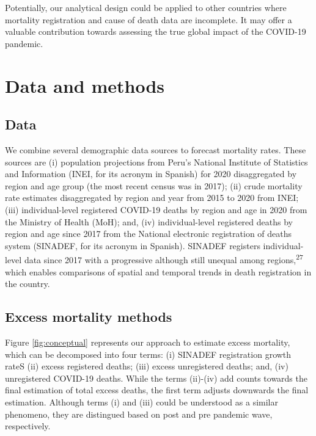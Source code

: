 \documentclass[
]{article}
\begin{document}
Potentially, our analytical design could be applied to other countries where mortality registration and cause of death data are incomplete. It may offer a valuable contribution towards assessing the true global impact of the COVID-19 pandemic.

\hypertarget{data-and-methods}{%
\section{Data and methods}\label{data-and-methods}}

\hypertarget{data}{%
\subsection{Data}\label{data}}

We combine several demographic data sources to forecast mortality rates. These sources are (i) population projections from Peru's National Institute of Statistics and Information (INEI, for its acronym in Spanish) for 2020 disaggregated by region and age group (the most recent census was in 2017); (ii) crude mortality rate estimates disaggregated by region and year from 2015 to 2020 from INEI; (iii) individual-level registered COVID-19 deaths by region and age in 2020 from the Ministry of Health (MoH); and, (iv) individual-level registered deaths by region and age since 2017 from the National electronic registration of deaths system (SINADEF, for its acronym in Spanish). SINADEF registers individual-level data since 2017 with a progressive although still unequal among regions,\textsuperscript{27} which enables comparisons of spatial and temporal trends in death registration in the country.

\hypertarget{excess-mortality-methods}{%
\subsection{Excess mortality methods}\label{excess-mortality-methods}}

Figure \ref{fig:conceptual} represents our approach to estimate excess mortality, which can be decomposed into four terms: (i) SINADEF registration growth rateS (ii) excess registered deaths; (iii) excess unregistered deaths; and, (iv) unregistered COVID-19 deaths. While the terms (ii)-(iv) add counts towards the final estimation of total excess deaths, the first term adjusts downwards the final estimation. Although terms (i) and (iii) could be understood as a similar phenomeno, they are distingued based on post and pre pandemic wave, respectively.
\end{document}
